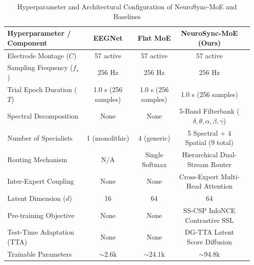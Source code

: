 \begin{table}[t]
\centering
\caption{Hyperparameter and Architectural Configuration of NeuroSync-MoE and Baselines}
\label{tab:architecture}
\begin{tabular}{lcccc}
\hline
\textbf{Hyperparameter / Component} & \textbf{EEGNet} & \textbf{Flat MoE} & \textbf{NeuroSync-MoE (Ours)} \\
\hline
Electrode Montage ($C$) & 57 active & 57 active & 57 active \\
Sampling Frequency ($f_s$) & 256 Hz & 256 Hz & 256 Hz \\
Trial Epoch Duration ($T$) & 1.0 s (256 samples) & 1.0 s (256 samples) & 1.0 s (256 samples) \\
Spectral Decomposition & None & None & 5-Band Filterbank ($\delta, \theta, \alpha, \beta, \gamma$) \\
Number of Specialists & 1 (monolithic) & 4 (generic) & 5 Spectral + 4 Spatial (9 total) \\
Routing Mechanism & N/A & Single Softmax & Hierarchical Dual-Stream Router \\
Inter-Expert Coupling & None & None & Cross-Expert Multi-Head Attention \\
Latent Dimension ($d$) & 16 & 64 & 64 \\
Pre-training Objective & None & None & SS-CSP InfoNCE Contrastive SSL \\
Test-Time Adaptation (TTA) & None & None & DG-TTA Latent Score Diffusion \\
Trainable Parameters & $\sim 2.6$k & $\sim 24.1$k & $\sim 94.8$k \\
\hline
\end{tabular}
\end{table}
